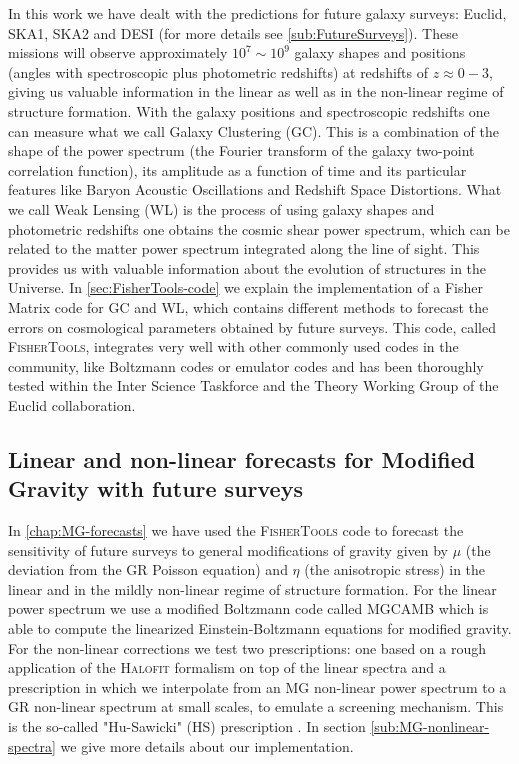 In this work we have dealt with the predictions for future galaxy surveys: Euclid, SKA1, SKA2 and DESI (for more details see \cref{sub:FutureSurveys}).
These missions will observe approximately $10^7 \sim 10^9$ galaxy shapes and positions (angles with spectroscopic plus photometric redshifts) at redshifts of $z \approx 0-3$, giving us valuable information
in the linear as well as in the non-linear regime of structure formation.
With the galaxy positions and spectroscopic redshifts one can measure what we call Galaxy Clustering (GC). This is 
a combination of the shape of the power spectrum (the Fourier transform of the galaxy two-point correlation function), 
its amplitude as a function of time and its particular features like Baryon Acoustic Oscillations and Redshift Space Distortions.
What we call Weak Lensing (WL) is the process of using galaxy shapes and photometric redshifts one obtains the cosmic shear power spectrum, which
can be related to the matter power spectrum integrated along the line of sight. This provides us with valuable information about the evolution
of structures in the Universe.
In \cref{sec:FisherTools-code} we explain the implementation of a Fisher Matrix code for GC and WL, which contains different methods 
to forecast the errors on cosmological parameters obtained by future surveys. This code, called \textsc{FisherTools}, integrates
very well with other commonly used codes in the community, like Boltzmann codes or emulator codes and has been thoroughly 
tested within the Inter Science Taskforce and the Theory Working Group of the Euclid collaboration.


\subsection*{Linear and non-linear forecasts for Modified Gravity with future surveys}

In \cref{chap:MG-forecasts} we have used the \textsc{FisherTools} code to 
forecast the sensitivity of future surveys to general modifications of gravity given by $\mu$ (the deviation from the GR Poisson equation) 
and $\eta$ (the anisotropic stress) in the linear and in the 
mildly non-linear regime of structure formation. 
For the linear power spectrum we use a modified Boltzmann code called \textsc{MGCAMB}  which is able to compute the linearized
Einstein-Boltzmann equations for modified gravity. For the non-linear corrections we test two prescriptions: one based on a rough application
of the \textsc{Halofit}  formalism on top of the linear spectra and a prescription in which we interpolate
from an MG non-linear power spectrum to a GR non-linear spectrum at small scales, to emulate a screening mechanism. This is the 
so-called "Hu-Sawicki" (HS) prescription . In section \cref{sub:MG-nonlinear-spectra} we give more details about our implementation.

